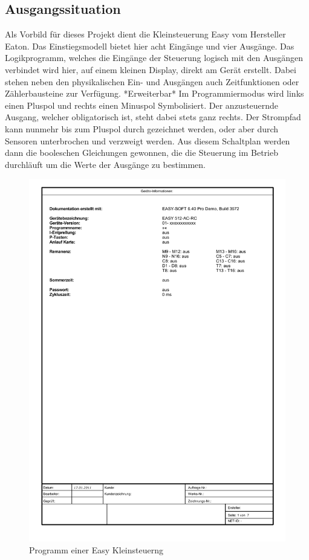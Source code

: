 \subsection{Ausgangssituation} 

Als Vorbild für dieses Projekt dient die Kleinsteuerung Easy vom Hersteller Eaton. Das Einstiegsmodell bietet hier acht Eingänge und vier Ausgänge. Das Logikprogramm, welches die Eingänge der Steuerung logisch mit den Ausgängen verbindet wird hier, auf einem kleinen Display, direkt am Gerät erstellt. Dabei stehen neben den physikalischen Ein- und Ausgängen auch Zeitfunktionen oder Zählerbausteine zur Verfügung. *Erweiterbar* Im Programmiermodus wird links einen Pluspol und rechts einen Minuspol Symbolisiert. Der anzusteuernde Ausgang, welcher obligatorisch ist, steht dabei stets ganz rechts. Der Strompfad kann nunmehr bis zum Pluspol durch gezeichnet werden, oder aber durch Sensoren unterbrochen und verzweigt werden. Aus diesem Schaltplan werden dann die booleschen Gleichungen gewonnen, die die Steuerung im Betrieb durchläuft um die Werte der Ausgänge zu bestimmen.

\begin{figure}[htbp]
	\centering
	\includegraphics[page=2, clip, trim=2.5cm 20cm 6.9cm 2.5cm, width=1.00\textwidth]{./code/GartenEasy.pdf}
	\caption{Programm einer Easy Kleinsteuerng}
	\label{fig:easyprogram}
\end{figure}

